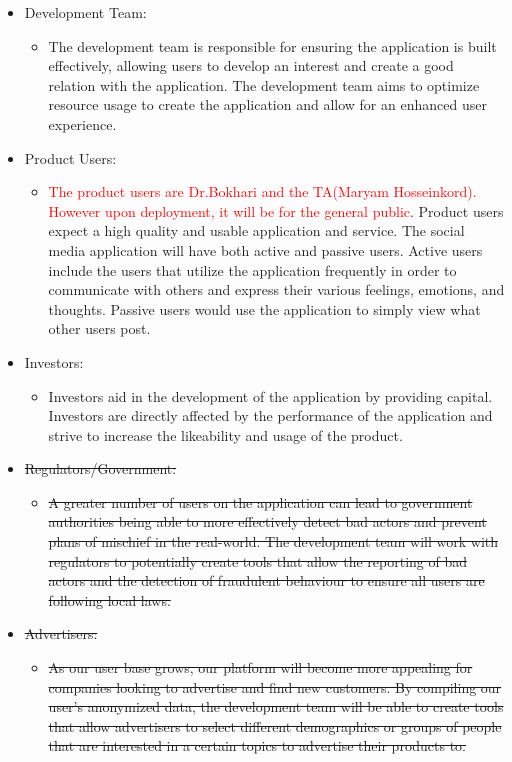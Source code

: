 \documentclass[12pt, titlepage]{article}
\begin{document}
\begin{itemize}
  \item Development Team:
  \begin{itemize}
      \item[] The development team is responsible for ensuring the application is built effectively, allowing users to develop an interest and create a good relation with the application. The development team aims to optimize resource usage to create the application and allow for an enhanced user experience. 
  \end{itemize}
  \item Product Users:
  \begin{itemize}
      \item[] \textcolor{red}{The product users are Dr.Bokhari and the TA(Maryam Hosseinkord). However upon deployment, it will be for the general public}. Product users expect a high quality and usable application and service. The social media application will have both active and passive users. Active users include the users that utilize the application frequently in order to communicate with others and express their various feelings, emotions, and thoughts. Passive users would use the application to simply view what other users post.  
  \end{itemize}
  \item Investors:
  \begin{itemize}
      \item[] Investors aid in the development of the application by providing capital. Investors are directly affected by the performance of the application and strive to increase the likeability and usage of the product. 
  \end{itemize}
  \item \sout{Regulators/Government:}
  \begin{itemize}
      \item[] \sout{A greater number of users on the application can lead to government authorities being able to more effectively detect bad actors and prevent plans of mischief in the real-world. The development team will work with regulators to potentially create tools that allow the reporting of bad actors and the detection of fraudulent behaviour to ensure all users are following local laws.}
  \end{itemize}
  \item \sout{Advertisers:}
  \begin{itemize}
      \item[] \sout{As our user base grows, our platform will become more appealing for companies looking to advertise and find new customers. By compiling our user's anonymized data, the development team will be able to create tools that allow advertisers to select different demographics or groups of people that are interested in a certain topics to advertise their products to.}

\end{itemize}
\end{itemize}
\end{document}
